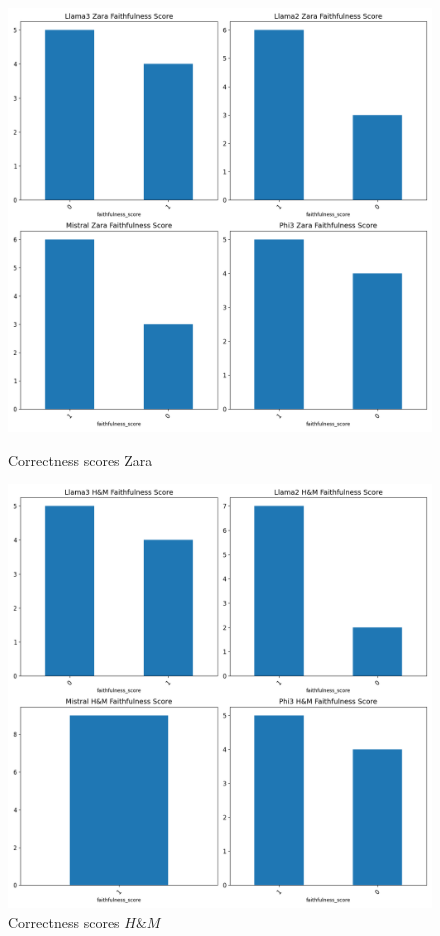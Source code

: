 \documentclass[]{article}
\begin{document}
\begin{figure}[H]
    \centering
    \begin{minipage}{0.49\textwidth}
        \centering
        \includegraphics[width=\textwidth]{./images/faith_zara_scene_det.png}
        \caption{Correctness scores Zara}
        \label{fig:faith_zara}
    \end{minipage}
    \hfill
    \begin{minipage}{0.49\textwidth}
        \centering
        \includegraphics[width=\textwidth]{./images/faith_hm_scene_det.png}
        \caption{Correctness scores $H\&M$}
        \label{fig:faith_hm}
    \end{minipage}
\end{figure}
\end{document}
